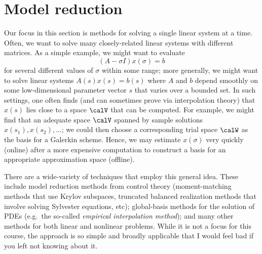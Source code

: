 \section{Model reduction}

Our focus in this section is methods for solving a single linear
system at a time.  Often, we want to solve many closely-related
linear systems with different matrices.  As a simple example,
we might want to evaluate
\[
  (A-\sigma I) x(\sigma) = b
\]
for several different values of $\sigma$ within some range; more
generally, we might want to solve linear systems $A(s) x(s) = b(s)$
where $A$ and $b$ depend smoothly on some low-dimensional parameter
vector $s$ that varies over a bounded set.  In such settings, one often
finds (and can sometimes prove via interpolation theory) that $x(s)$
lies close to a space $\calV$ that can be computed. For example, we
might find that an adequate space $\calV$ spanned by sample solutions
$x(s_1), x(s_2), \ldots$; we could then choose a corresponding trial
space $\calW$ as the basis for a Galerkin scheme.  Hence, we may
estimate $x(\sigma)$ very quickly (online) after a more expensive
computation to construct a basis for an appropriate approximation space
(offline).

There are a wide-variety of techniques that employ this general idea.
These include model reduction methods from control theory
(moment-matching methods that use Krylov subspaces, truncated balanced
realization methods that involve solving Sylvester equations, etc);
global-basis methods for the solution of PDEs (e.g.~the so-called {\em
empirical interpolation method}); and many other methods for both
linear and nonlinear problems.  While it is not a focus for this course,
the approach is so simple and broadly applicable that I would feel bad
if you left not knowing about it.
